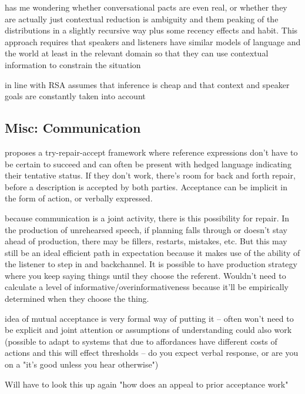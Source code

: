 \documentclass[]{article}
\begin{document}
 \cite{piantadosi2012} has me wondering whether conversational pacts are even real, or whether they are actually just contextual reduction is ambiguity and them peaking of the distributions in a slightly recursive way plus some recency effects and habit. This approach requires that speakers and listeners have similar models of language and the world at least in the relevant domain so that they can use contextual information to constrain the situation 
 
 \cite{piantadosi2012} in line with RSA assumes that inference is cheap and that context and speaker goals are constantly taken into account 

\subsection{Misc: Communication}

\cite{clark1986} proposes a try-repair-accept framework where reference expressions don't have to be certain to succeed and can often be present with hedged language indicating their tentative status. If they don't work, there's room for back and forth repair, before a description is accepted by both parties. Acceptance can be implicit in the form of action, or verbally expressed. 

\cite{clark1986} because communication is a joint activity, there is this possibility for repair. In the production of unrehearsed speech, if planning falls through or doesn't stay ahead of production, there may be fillers, restarts, mistakes, etc. But this may still be an ideal efficient path in expectation because it makes use of the ability of the listener to step in and backchannel. It is possible to have production strategy where you keep saying things until they choose the referent. Wouldn't need to calculate a level of informative/overinformativeness because it'll be empirically determined when they choose the thing. 

\cite{clark1986} idea of mutual acceptance is very formal way of putting it -- often won't need to be explicit and joint attention or assumptions of understanding could also work (possible to adapt to systems that due to affordances have different costs of actions and this will effect thresholds -- do you expect verbal response, or are you on a "it's good unless you hear otherwise") 

\cite{clark1986} Will have to look this up again "how does an appeal to prior acceptance work"
\end{document}

